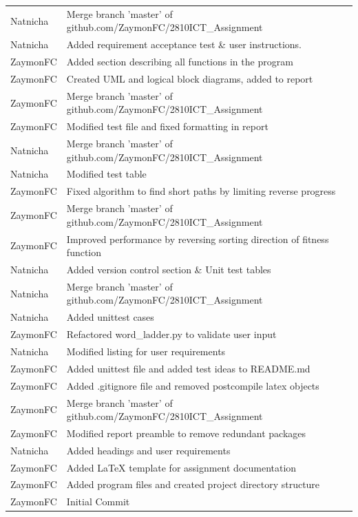 \documentclass[12pt, a4]{report}
\begin{document}
			\begin{tabular}{ | p{2cm} | p{13cm} | }
				\hline
			Natnicha & Merge branch 'master' of github.com/ZaymonFC/2810ICT\_Assignment \\ 
			Natnicha & Added requirement acceptance test \& user instructions. \\ 
			ZaymonFC & Added section describing all functions in the program \\ 
			ZaymonFC & Created UML and logical block diagrams, added to report \\ 
			ZaymonFC & Merge branch 'master' of github.com/ZaymonFC/2810ICT\_Assignment \\ 
			ZaymonFC & Modified test file and fixed formatting in report \\ 
			Natnicha & Merge branch 'master' of github.com/ZaymonFC/2810ICT\_Assignment \\ 
			Natnicha & Modified test table \\ 
			ZaymonFC & Fixed algorithm to find short paths by limiting reverse progress \\ 
			ZaymonFC & Merge branch 'master' of github.com/ZaymonFC/2810ICT\_Assignment \\ 
			ZaymonFC & Improved performance by reversing sorting direction of fitness function \\ 
			Natnicha & Added version control section \& Unit test tables \\ 
			Natnicha & Merge branch 'master' of github.com/ZaymonFC/2810ICT\_Assignment \\ 
			Natnicha & Added unittest cases \\ 
			ZaymonFC & Refactored word\_ladder.py to validate user input \\ 
			Natnicha & Modified listing for user requirements \\ 
			ZaymonFC & Added unittest file and added test ideas to README.md \\ 
			ZaymonFC & Added .gitignore file and removed postcompile latex objects \\ 
			ZaymonFC & Merge branch 'master' of github.com/ZaymonFC/2810ICT\_Assignment \\ 
			ZaymonFC & Modified report preamble to remove redundant packages \\ 
			Natnicha & Added headings and user requirements \\ 
			ZaymonFC & Added LaTeX template for assignment documentation \\ 
			ZaymonFC & Added program files and created project directory structure \\ 
			ZaymonFC & Initial Commit \\ \hline
			
		\end{tabular}
		
\end{document}
